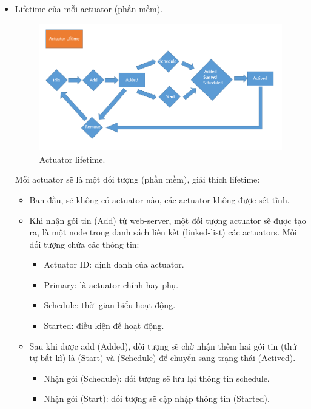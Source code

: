 \documentclass[a4paper,12pt,oneside]{article}
\begin{document}
\begin{itemize}
\item Lifetime của mỗi actuator (phần mềm).
\begin{center}
\begin{figure}[h!]
\begin{center}
\includegraphics[scale=0.7]{hinh/actuator_lifetime.PNG}
\end{center}
\caption{Actuator lifetime.}
\end{figure}
\end{center}
\noindent Mỗi actuator sẽ là một đối tượng (phần mềm), giải thích lifetime:
	\begin{itemize}
	\item Ban đầu, sẽ không có actuator nào, các actuator không được sét tĩnh.
	\item  Khi nhận gói tin (Add) từ web-server, một đối tượng actuator sẽ được tạo ra, là một node trong danh sách liên kết (linked-list) các actuators. Mỗi đối tượng chứa các thông tin:
\begin{itemize}
\item Actuator ID: định danh của actuator.
\item Primary: là actuator chính hay phụ.
\item Schedule: thời gian biểu hoạt động.
\item Started: điều kiện để hoạt động.
\end{itemize}

	\item Sau khi được add (Added), đối tượng sẽ chờ nhận thêm hai gói tin (thứ tự bất kì) là (Start) và (Schedule) để chuyển sang trạng thái (Actived).
		\begin{itemize}
			\item Nhận gói (Schedule): đối tượng sẽ lưu lại thông tin schedule.
			\item Nhận gói (Start): đối tượng sẽ cập nhập thông tin (Started). 
		\end{itemize}			


\end{itemize}
\end{itemize}
\end{document}
